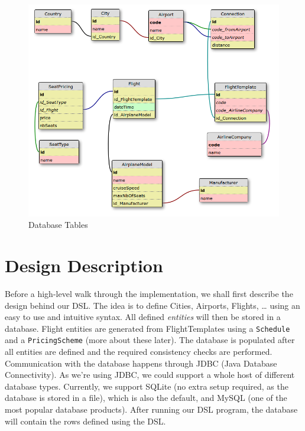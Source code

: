 \documentclass[a4paper]{article}
\newcommand{\cc}[1]{\texttt{#1}}
\begin{document}
\begin{figure}[ht!]
  \includegraphics[width=1.0\textwidth]{../analysis/dbtables-diagram.png}
  \caption{Database Tables}\label{fig:database-tables}
\end{figure}

\section{Design Description}
\label{sec:design-description}



Before a high-level walk through the implementation, we shall first describe the design behind our DSL.
The idea is to define Cities, Airports, Flights, \ldots{} using an easy to use and intuitive syntax.
All defined \emph{entities} will then be stored in a database.
Flight entities are generated from FlightTemplates using a \cc{Schedule} and a \cc{Pricing\-Scheme} (more about these later).
The database is populated after all entities are defined and the required consistency checks are performed.
Communication with the database happens through \textsc{JDBC} (Java Database Connectivity).
As we're using \textsc{JDBC}, we could support a whole host of different database types.
Currently, we support SQLite (no extra setup required, as the database is stored in a file), which is also the default, and MySQL (one of the most popular database products).
After running our DSL program, the database will contain the rows defined using the DSL.\@
\end{document}
